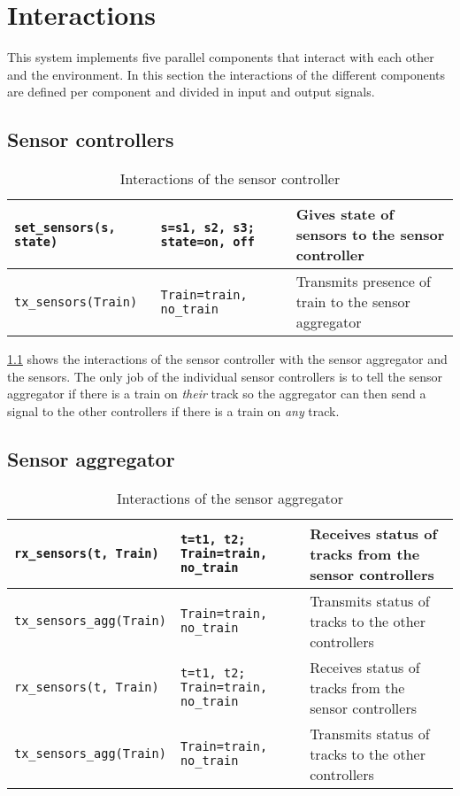 \documentclass[final]{report}
\begin{document}
\chapter{Interactions}
\label{ch:interactions}
This system implements five parallel components that interact with each other and the environment.
In this section the interactions of the different components are defined per component and divided in input and output signals.

\section{Sensor controllers}
\begin{table}[H]
\centering
    \begin{tabular}{|l|l|l|}
    \hline
    \texttt{set\_sensors(s, state)} & \texttt{s=s1, s2, s3; state=on, off}  & Gives state of sensors to the sensor controller      \\ \hline
    \texttt{tx\_sensors(Train)}     & \texttt{Train=train, no\_train}       & Transmits presence of train to the sensor aggregator \\ \hline
    \end{tabular}
    \caption{Interactions of the sensor controller}
    \label{tab:sensorSignals}
\end{table}

\cref{tab:sensorSignals} shows the interactions of the sensor controller with the sensor aggregator and the sensors.
The only job of the individual sensor controllers is to tell the sensor aggregator if there is a train on \textit{their} track so the aggregator can then send a signal to the other controllers if there is a train on \textit{any} track.

\section{Sensor aggregator}
\begin{table}[H]
\centering
    \begin{tabular}{|l|l|l|}
    \hline
    \texttt{rx\_sensors(t, Train)}   & \texttt{t=t1, t2; Train=train, no\_train} & Receives status of tracks from the sensor controllers \\ \hline
    \texttt{tx\_sensors\_agg(Train)} & \texttt{Train=train, no\_train}           & Transmits status of tracks to the other controllers   \\
    \texttt{rx\_sensors(t, Train)}   & \texttt{t=t1, t2; Train=train, no\_train} & Receives status of tracks from the sensor controllers \\ \hline
    \texttt{tx\_sensors\_agg(Train)} & \texttt{Train=train, no\_train}           & Transmits status of tracks to the other controllers   \\ \hline
    \end{tabular}
\caption{Interactions of the sensor aggregator}
\label{tab:sensorAggSignals}
\end{table}
\end{document}
